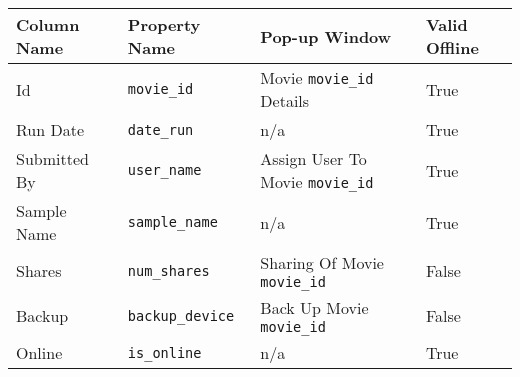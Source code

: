 \begin{tabularx}{\textwidth}{X|l|X|l}
\toprule
 Column Name   & Property Name   & Pop-up Window                 & Valid Offline   \\
\midrule
 Id            & \texttt{movie\_id}        & Movie \texttt{movie\_id} Details        & True            \\
 Run Date      & \texttt{date\_run}        & n/a                           & True            \\
 Submitted By  & \texttt{user\_name}       & Assign User To Movie \texttt{movie\_id} & True            \\
 Sample Name   & \texttt{sample\_name}     & n/a                           & True            \\
 Shares        & \texttt{num\_shares}      & Sharing Of Movie \texttt{movie\_id}     & False           \\
 Backup        & \texttt{backup\_device}   & Back Up Movie \texttt{movie\_id}        & False           \\
 Online        & \texttt{is\_online}       & n/a                           & True            \\
\bottomrule
\end{tabularx}